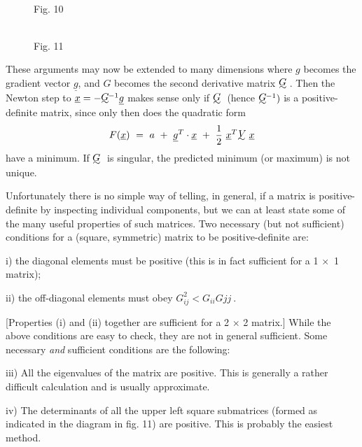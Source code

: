 \begin{figure}
\begin{minipage}[b]{11cm}
\begin{center}\mbox{}\\
Fig. 10
\end{center}
\end{minipage} \hfill
\begin{minipage}[b]{49mm}
\begin{center}\mbox{}\\[5mm]
Fig. 11
\end{center}
\end{minipage}
\end{figure}
      These arguments may now be extended to many dimensions where $g$
becomes the gradient vector ${\underline{g}}$, and $G$ becomes the second derivative matrix
$\UTG$. Then the Newton step to ${\underline{x}} = -\UTG\!\!^{-1}{\underline{g}}$ makes sense 
only if $\UTG$
 (hence $\UTG\!\!^{-1})$ is a positive-definite matrix, since only then does the quadratic form
 $$F({\underline{x}})~=~a~+~{\underline{g}}^T \cdot {\underline{x}}~+~{1\over 2}~{\underline{x}}^T
\UTV {\underline{x}}$$
have a minimum.  If $\UTG$ is singular, the predicted minimum (or maximum)
is not unique.
 
     Unfortunately there is no simple way of telling, in general, if a
matrix is positive-definite by inspecting individual components, but we
can at least state some of the many useful properties of such matrices.
Two necessary (but not sufficient) conditions for a (square, symmetric)
matrix to be positive-definite are:
 
  i) the diagonal elements must be positive (this is in fact sufficient
     for a 1 $\times$~1 matrix);
 
 ii) the off-diagonal elements must obey $G^2_{ij} < G_{ii}G{jj}~.$
 
[Properties (i) and (ii) together are sufficient for a 2 $\times$ 2 matrix.]
While the above conditions are easy to check, they are not in general
sufficient.  Some necessary {\em and} sufficient conditions are the following:
 
 iii) All the eigenvalues of the matrix are positive. This is generally
      a rather difficult calculation and is usually approximate.
 
 iv) The determinants of all the upper left square submatrices (formed
     as indicated in the diagram in fig. 11) are
     positive.  This is probably the easiest method.
 
